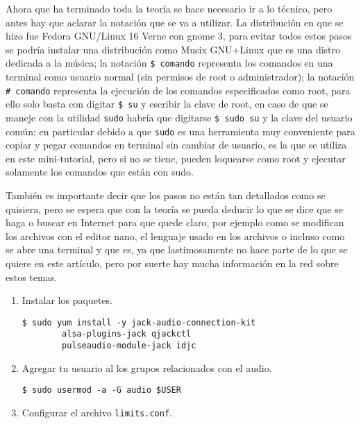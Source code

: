 \begin{multicols}{2}
Ahora que ha terminado toda la teoría se hace necesario
ir a lo técnico, pero antes hay que aclarar la notación que se va a utilizar. La distribución en que se hizo fue Fedora GNU/Linux 16 Verne con gnome 3, para evitar todos estos pasos se podría instalar una distribución como Musix GNU+Linux que es una distro dedicada a la música; la notación \verb!$ comando! representa los comandos en una terminal como usuario normal (sin permisos de root o administrador); la notación \verb!# comando! representa la ejecución de los comandos especificados como root, para ello solo basta con digitar \verb!$ su! y escribir la clave de root, en caso de que se maneje con la utilidad \verb!sudo! habría que digitarse \verb!$ sudo su! y la clave del usuario común; en particular debido a que \verb!sudo! es una herramienta muy conveniente para copiar y pegar comandos en terminal sin cambiar de usuario, es la que se utiliza en este mini-tutorial, pero si no se tiene, pueden loquearse como root y ejecutar solamente los comandos que están con sudo.

También es importante decir que los pasos no están tan detallados como se quisiera, pero se espera que con la teoría se pueda deducir lo que se dice que se haga o buscar en Internet para que quede claro, por ejemplo como se modifican los archivos con el editor nano, el lenguaje usado en los archivos o incluso como se abre una terminal y que es, ya que lastimosamente no hace parte de lo que se quiere en este artículo, pero por suerte hay mucha información en la red sobre estos temas.

\begin{enumerate}

\item Instalar los paquetes. 

\lstset{language=html,frame=tb,framesep=2pt,basicstyle=\footnotesize} 
\begin{lstlisting}
$ sudo yum install -y jack-audio-connection-kit 
		alsa-plugins-jack qjackctl 
		pulseaudio-module-jack idjc
\end{lstlisting}

\item Agregar tu usuario al los grupos relacionados con el audio.

\begin{lstlisting}
$ sudo usermod -a -G audio $USER
\end{lstlisting}

\item Configurar el archivo \verb!limits.conf!. 


\end{enumerate}
\end{multicols}
